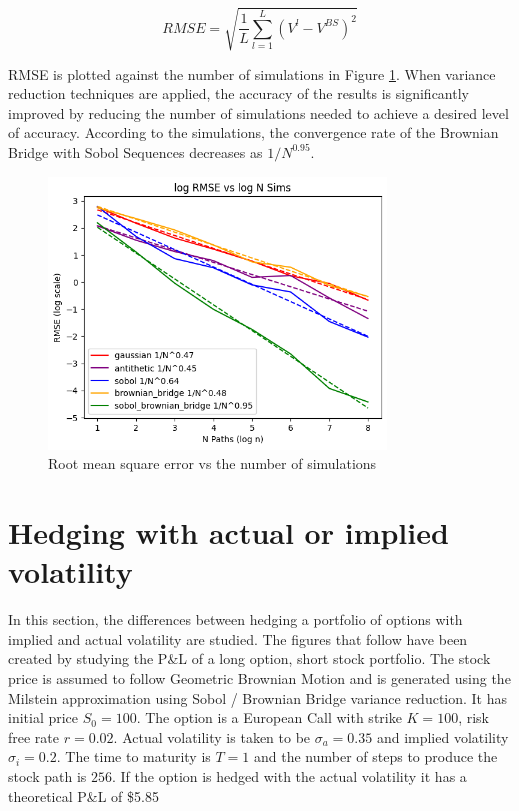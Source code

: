 \documentclass{article}
\begin{document}
\[
RMSE = \sqrt{\frac{1}{L} \sum_{l=1}^{L} (V^l - V^{BS})^2}
\]

RMSE is plotted against the number of simulations in Figure \ref{fig:rmse}. When variance reduction techniques are
applied, the accuracy of the results is significantly improved by reducing the number of simulations needed to achieve
a desired level of accuracy.  According to the simulations, the convergence rate of the Brownian Bridge with Sobol Sequences
decreases as $1/N^{0.95}$.

\begin{figure}[h]
    \centering
    \includegraphics[width=0.8\textwidth]{images/rmse.png}
    \caption{Root mean square error vs the number of simulations}
    \label{fig:rmse}
\end{figure}

\newpage
\newpage

\section{Hedging with actual or implied volatility}

In this section, the differences between hedging a portfolio of options with implied and actual volatility are studied.  The figures that follow have been created by 
studying the P\&L of a long option, short stock portfolio. The stock price is assumed to follow Geometric Brownian Motion and is generated using
the Milstein approximation using Sobol / Brownian Bridge variance reduction. It has initial price $S_0 = 100$. The option is a European Call with strike $K = 100$, risk free rate $r = 0.02$.
Actual volatility is taken to be $\sigma_a = 0.35$ and implied volatility $\sigma_i = 0.2$. The time to maturity is $T = 1$ and the number of steps to produce the stock path is $256$.
If the option is hedged with the actual volatility it has a theoretical P\&L of \$5.85
\end{document}
